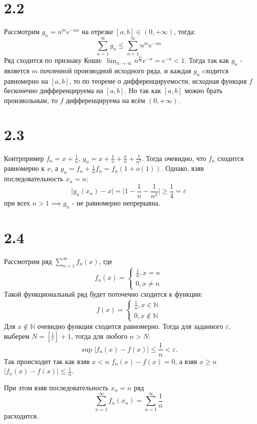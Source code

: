 \documentclass[12pt]{article}
\begin{document}
\section{2.2}
Рассмотрим $g_n = n^m e^{-nx}$ на отрезке $[a, b] \in (0, +\infty)$, тогда: 
\[
    \sum_{n=1}^{\infty} g_n \leq \sum_{n=1}^{\infty} n^m e^{-an}  
\]
Ряд сходится по признаку Коши: $\lim_{n \to \infty} n^{\frac{m}{n}} e^{-a} = e^{-a} < 1$. 
Тогда так как $g_n$ - является $m$ почленной производной исходного ряда, и каждая $g_n$ cходится 
равномерно на $[a, b]$, то по теореме о дифференцируемости, исходная функция $f$ бесконечно дифференцируема на $[a, b]$. 
Но так как $[a, b]$ можно брать произвольным, то $f$ дифференцируема на всём $(0, +\infty )$.     
\section{2.3}
Контрпример $f_n = x + \frac{1}{n}$, $g_n = x + \frac{1}{n} + \frac{x}{n} + \frac{1}{n^2}$. 
Тогда очевидно, что $f_n$ сходится равномерно к $x$, а $g_n = f_n + \frac{1}{n}f_n = f_n (1 + o(1))$. 
Однако, взяв последовательность $x_n = n$:
\[
    \vert g_n(x_n) - x \vert = \vert 1 - \frac{1}{n} - \frac{1}{n^2} \vert \geq \frac{1}{4} = \varepsilon  
\]    
при всех $n > 1 \implies g_n$ - не равномерно непрерывна.   
\section{2.4}
Рассмотрим ряд $\sum_{n=1}^{\infty} f_n(x)$, где 
\[
    f_n(x) = 
    \begin{cases}
        \frac{1}{n}, x = n \\
        0, x \neq n
    \end{cases} 
\]  
Такой функциональный ряд будет поточечно сходится к функции: 
\[
    f(x) = 
    \begin{cases}
        \frac{1}{n}, x \in \mathbb{N} \\
        0, x \notin \mathbb{N}
    \end{cases}
\]
Для $x \notin \mathbb{N}$ очевидно функция сходится равномерно. 
Тогда для заданного $\varepsilon$, выберем $N = \left[\frac{1}{\varepsilon}\right] + 1$, тогда для любого 
$n > N$: 
\[
    \sup \vert f_n(x) - f(x) \vert \leq \frac{1}{n} < \varepsilon.
\]  
Так происходит так как взяв $x < n$ $f_n(x) - f(x) = 0$, а взяв $x \geq n$ $\vert f_n(x) - f(x) \vert \leq \frac{1}{n}$.

При этом взяв последовательность $x_n = n$ ряд 
\[
    \sum_{n=1}^{\infty} f_n(x_n) = \sum_{n=1}^{\infty} \frac{1}{n}
\] 
расходится.
\end{document}
